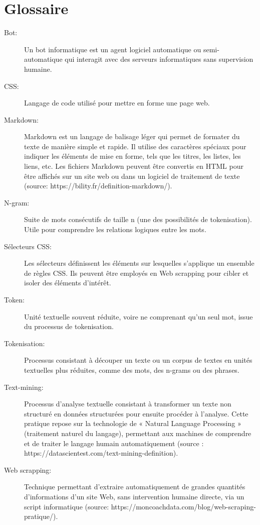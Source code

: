 \documentclass{book}
\begin{document}
\chapter*{Glossaire}
\begin{description}

    \item[Bot:] Un bot informatique est un agent logiciel automatique ou
        semi-automatique qui interagit avec des serveurs informatiques sans supervision
        humaine.

    \item[CSS:] Langage de code utilisé pour mettre en forme une page web.

    \item[Markdown:] Markdown est un langage de balisage léger qui permet de
        formater du texte de manière simple et rapide. Il utilise des caractères
        spéciaux pour indiquer les éléments de mise en forme, tels que les titres, les
        listes, les liens, etc. Les fichiers Markdown peuvent être convertis en HTML
        pour être affichés sur un site web ou dans un logiciel de traitement de texte
        (source: https://bility.fr/definition-markdown/).

    \item[N-gram:] Suite de mots consécutifs de taille n (une des possibilités
        de tokenisation). Utile pour comprendre les relations logiques entre les mots.

    \item[Sélecteurs CSS:] Les sélecteurs définissent les éléments sur
        lesquelles s'applique un ensemble de règles CSS. Ils peuvent être employés en
        Web scrapping pour cibler et isoler des éléments d'intérêt.

    \item[Token:] Unité textuelle souvent réduite, voire ne comprenant qu'un
        seul mot, issue du processus de tokenisation.

    \item[Tokenisation:] Processus consistant à découper un texte ou un corpus
        de textes en unités textuelles plus réduites, comme des mots, des n-grams ou
        des phrases.

    \item[Text-mining:] Processus d'analyse textuelle consistant à transformer
        un texte non structuré en données structurées pour ensuite procéder à
        l’analyse. Cette pratique repose sur la technologie de « Natural Language
        Processing » (traitement naturel du langage), permettant aux machines de
        comprendre et de traiter le langage humain automatiquement (source :
        https://datascientest.com/text-mining-definition).

    \item[Web scrapping:] Technique permettant d’extraire automatiquement de
        grandes quantités d’informations d’un site Web, sans intervention humaine
        directe, via un script informatique (source:
        https://moncoachdata.com/blog/web-scraping-pratique/).

\end{description}
\thispagestyle{fancy}
\end{document}
